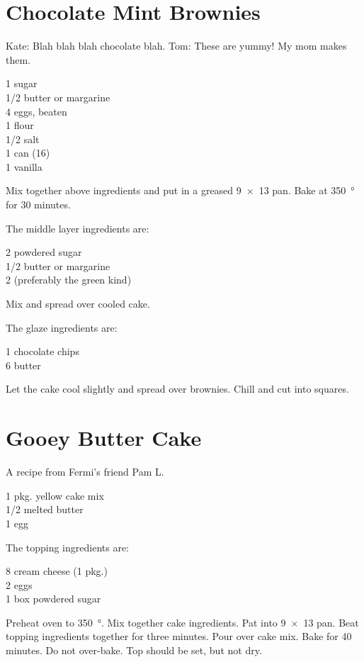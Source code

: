 \section{Chocolate Mint Brownies}

\begin{open}
  Kate: Blah blah blah chocolate blah. Tom: These are yummy!  My mom makes
  them.
\end{open}
\begin{ingredients}
  \SI{1}{\cup} sugar\\
  \SI{1/2}{\cup} butter or margarine\\
  4 eggs, beaten\\
  \SI{1}{\cup} flour\\
  \SI{1/2}{\teaspoon} salt\\
  1 can  (\SI{16}{\ounce})\\
  \SI{1}{\teaspoon} vanilla
\end{ingredients}
Mix together above ingredients and put in a greased \SI{9x13}{\inch} pan.
Bake at \SI{350}{\degree} for 30 minutes.

The middle layer ingredients are:
\begin{ingredients}
  \SI{2}{\cup} powdered sugar\\
  \SI{1/2}{\cup} butter or margarine\\
  \SI{2}{\tblspoon}  (preferably the green kind)
\end{ingredients}
Mix and spread over cooled cake.

The glaze ingredients are:
\begin{ingredients}
  \SI{1}{\cup} chocolate chips\\
  \SI{6}{\tblspoon} butter
\end{ingredients}
Let the cake cool slightly and spread over brownies.  Chill and cut into
squares.

\section{Gooey Butter Cake}

\begin{open}
  A recipe from Fermi's friend Pam L.
\end{open}
\begin{ingredients}
  1 pkg. yellow cake mix\\
  \SI{1/2}{\cup} melted butter\\
  1 egg
\end{ingredients}
The topping ingredients are:
\begin{ingredients}
  \SI{8}{\ounce} cream cheese (1 pkg.)\\
  2 eggs\\
  1 box powdered sugar
\end{ingredients}
Preheat oven to \SI{350}{\degree}.  Mix together cake ingredients.  Pat into
\SI{9x13}{\inch} pan.  Beat topping ingredients together for three minutes.
Pour over cake mix.  Bake for 40 minutes.  Do not over-bake. Top should be
set, but not dry.


